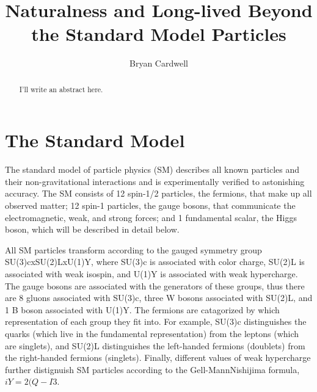 \documentclass[12pt]{article}
\title{Naturalness and Long-lived Beyond the Standard Model Particles}
\author{Bryan Cardwell}
\begin{document}
\singlespacing
\maketitle

\begin{abstract}

I'll write an abstract here.

\end{abstract}

\newpage
\tableofcontents
\newpage
\doublespacing
\linenumbers
{}

\section{The Standard Model}
    The standard model of particle physics (SM) describes all known particles and their non-gravitational interactions and is experimentally verified to astonishing  accuracy. The SM consists of 12 spin-1/2 particles, the fermions, that make up all observed matter; 12 spin-1 particles, the gauge bosons, that communicate the electromagnetic, weak, and strong forces; and 1 fundamental scalar, the Higgs boson, which will be described in detail below.
    
    All SM particles transform according to the gauged symmetry group SU(3)cxSU(2)LxU(1)Y, where SU(3)c is associated with color charge, SU(2)L is associated with weak isospin, and U(1)Y is associated with weak hypercharge. The gauge bosons are associated with the generators of these groups, thus there are 8 gluons associated with SU(3)c, three W bosons associated with SU(2)L, and 1 B boson associated with U(1)Y. The fermions are catagorized by which representation of each group they fit into. For example, SU(3)c distinguishes the quarks (which live in the fundamental representation) from the leptons (which are singlets), and SU(2)L distinguishes the left-handed fermions (doublets) from the right-handed fermions (singlets). Finally, different values of weak hypercharge further distignuish SM particles according to the Gell-MannNishijima formula, $iY=2(Q-I3$.
\end{document}
